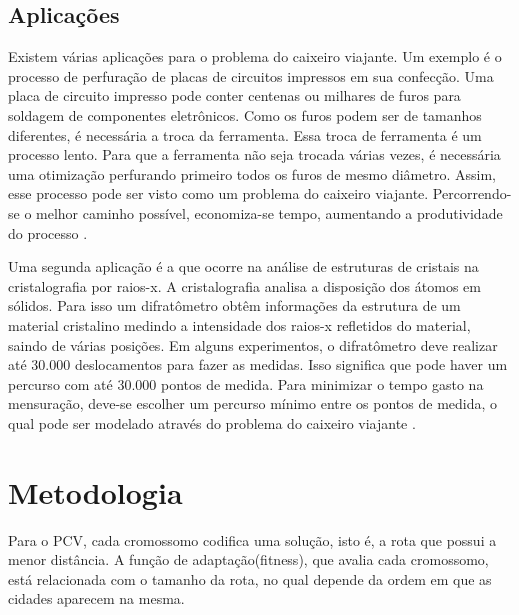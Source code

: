 \documentclass[
article,			%
11pt,				%
oneside,			%
a4paper,			%
english,			%
brazil,				%
sumario=tradicional
]{article}
\begin{document}
	\subsection{Aplicações} 
	
	Existem várias aplicações para o problema do caixeiro viajante. \cite{REINELT} Um exemplo é o processo de perfuração de placas de circuitos impressos em sua confecção. Uma placa de circuito impresso pode conter centenas ou milhares de furos para soldagem de componentes eletrônicos. Como os furos podem ser de tamanhos diferentes, é necessária a troca da ferramenta. Essa troca de ferramenta é um processo lento. Para que a ferramenta não seja trocada várias vezes, é necessária uma otimização perfurando primeiro todos os furos de mesmo diâmetro. Assim, esse processo pode ser visto como um problema do caixeiro viajante. Percorrendo-se o melhor caminho possível, economiza-se tempo, aumentando a produtividade do processo \cite{FREEDO}.
	
	Uma segunda aplicação é a que ocorre na análise de estruturas de cristais na cristalografia por raios-x. A cristalografia analisa a disposição dos átomos em sólidos. Para isso um difratômetro obtêm informações da estrutura de um material cristalino medindo a intensidade dos raios-x refletidos do material, saindo de várias posições. Em alguns experimentos, o difratômetro deve realizar até 30.000 deslocamentos para fazer as medidas. Isso significa que pode haver um percurso com até 30.000 pontos de medida. Para minimizar o tempo gasto na mensuração, deve-se escolher um percurso mínimo entre os pontos de medida, o qual pode ser modelado através do problema do caixeiro viajante \cite{FREEDO}.
	
	\section{Metodologia}
	
	Para o PCV, cada cromossomo codifica uma solução, isto é, a rota que possui a menor distância. A função de
	adaptação(fitness), que avalia cada cromossomo, está relacionada com o tamanho da rota, no qual depende da ordem em que as cidades aparecem na mesma.
	
\end{document}
